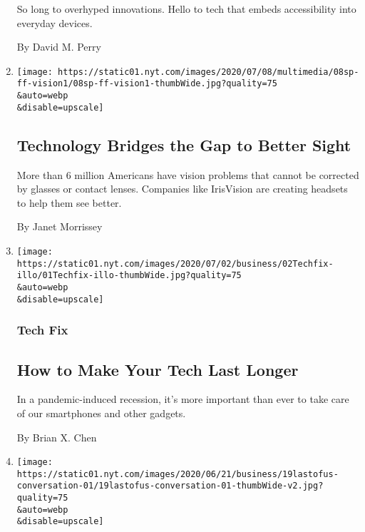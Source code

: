 \begin{enumerate}
  So long to overhyped innovations. Hello to tech that embeds
  accessibility into everyday devices.

  By David M. Perry
\item
  \href{/2020/07/07/health/vision-problems-technology-headsets.html}{}

  \texttt{[image: https://static01.nyt.com/images/2020/07/08/multimedia/08sp-ff-vision1/08sp-ff-vision1-thumbWide.jpg?quality=75\\\&auto=webp\\\&disable=upscale]}

  \hypertarget{technology-bridges-the-gap-to-better-sight}{%
  \subsection{Technology Bridges the Gap to Better
  Sight}\label{technology-bridges-the-gap-to-better-sight}}

  More than 6 million Americans have vision problems that cannot be
  corrected by glasses or contact lenses. Companies like IrisVision are
  creating headsets to help them see better.

  By Janet Morrissey
\item
  \href{/2020/07/01/technology/personaltech/make-your-tech-last-longer.html}{}

  \texttt{[image: https://static01.nyt.com/images/2020/07/02/business/02Techfix-illo/01Techfix-illo-thumbWide.jpg?quality=75\\\&auto=webp\\\&disable=upscale]}

  \hypertarget{tech-fix-1}{%
  \subsubsection{Tech Fix}\label{tech-fix-1}}

  \hypertarget{how-to-make-your-tech-last-longer}{%
  \subsection{How to Make Your Tech Last
  Longer}\label{how-to-make-your-tech-last-longer}}

  In a pandemic-induced recession, it's more important than ever to take
  care of our smartphones and other gadgets.

  By Brian X. Chen
\item
  \href{/2020/06/19/technology/last-of-us-2-gameplay.html}{}

  \texttt{[image: https://static01.nyt.com/images/2020/06/21/business/19lastofus-conversation-01/19lastofus-conversation-01-thumbWide-v2.jpg?quality=75\\\&auto=webp\\\&disable=upscale]}


\end{enumerate}
